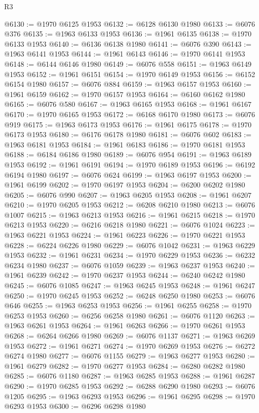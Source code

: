 \begin{lexlean}{R3}
\begin{coremodule}
@6130 := @1970 @6125 @1953
@6132 := @6128 @6130 @1980
@6133 := @6076 @376
@6135 := @1963 @6133 @1953
@6136 := @1961 @6135
@6138 := @1970 @6133 @1953
@6140 := @6136 @6138 @1980
@6141 := @6076 @390
@6143 := @1963 @6141 @1953
@6144 := @1961 @6143
@6146 := @1970 @6141 @1953
@6148 := @6144 @6146 @1980
@6149 := @6076 @558
@6151 := @1963 @6149 @1953
@6152 := @1961 @6151
@6154 := @1970 @6149 @1953
@6156 := @6152 @6154 @1980
@6157 := @6076 @884
@6159 := @1963 @6157 @1953
@6160 := @1961 @6159
@6162 := @1970 @6157 @1953
@6164 := @6160 @6162 @1980
@6165 := @6076 @580
@6167 := @1963 @6165 @1953
@6168 := @1961 @6167
@6170 := @1970 @6165 @1953
@6172 := @6168 @6170 @1980
@6173 := @6076 @919
@6175 := @1963 @6173 @1953
@6176 := @1961 @6175
@6178 := @1970 @6173 @1953
@6180 := @6176 @6178 @1980
@6181 := @6076 @602
@6183 := @1963 @6181 @1953
@6184 := @1961 @6183
@6186 := @1970 @6181 @1953
@6188 := @6184 @6186 @1980
@6189 := @6076 @954
@6191 := @1963 @6189 @1953
@6192 := @1961 @6191
@6194 := @1970 @6189 @1953
@6196 := @6192 @6194 @1980
@6197 := @6076 @624
@6199 := @1963 @6197 @1953
@6200 := @1961 @6199
@6202 := @1970 @6197 @1953
@6204 := @6200 @6202 @1980
@6205 := @6076 @990
@6207 := @1963 @6205 @1953
@6208 := @1961 @6207
@6210 := @1970 @6205 @1953
@6212 := @6208 @6210 @1980
@6213 := @6076 @1007
@6215 := @1963 @6213 @1953
@6216 := @1961 @6215
@6218 := @1970 @6213 @1953
@6220 := @6216 @6218 @1980
@6221 := @6076 @1024
@6223 := @1963 @6221 @1953
@6224 := @1961 @6223
@6226 := @1970 @6221 @1953
@6228 := @6224 @6226 @1980
@6229 := @6076 @1042
@6231 := @1963 @6229 @1953
@6232 := @1961 @6231
@6234 := @1970 @6229 @1953
@6236 := @6232 @6234 @1980
@6237 := @6076 @1059
@6239 := @1963 @6237 @1953
@6240 := @1961 @6239
@6242 := @1970 @6237 @1953
@6244 := @6240 @6242 @1980
@6245 := @6076 @1085
@6247 := @1963 @6245 @1953
@6248 := @1961 @6247
@6250 := @1970 @6245 @1953
@6252 := @6248 @6250 @1980
@6253 := @6076 @646
@6255 := @1963 @6253 @1953
@6256 := @1961 @6255
@6258 := @1970 @6253 @1953
@6260 := @6256 @6258 @1980
@6261 := @6076 @1120
@6263 := @1963 @6261 @1953
@6264 := @1961 @6263
@6266 := @1970 @6261 @1953
@6268 := @6264 @6266 @1980
@6269 := @6076 @1137
@6271 := @1963 @6269 @1953
@6272 := @1961 @6271
@6274 := @1970 @6269 @1953
@6276 := @6272 @6274 @1980
@6277 := @6076 @1155
@6279 := @1963 @6277 @1953
@6280 := @1961 @6279
@6282 := @1970 @6277 @1953
@6284 := @6280 @6282 @1980
@6285 := @6076 @1180
@6287 := @1963 @6285 @1953
@6288 := @1961 @6287
@6290 := @1970 @6285 @1953
@6292 := @6288 @6290 @1980
@6293 := @6076 @1205
@6295 := @1963 @6293 @1953
@6296 := @1961 @6295
@6298 := @1970 @6293 @1953
@6300 := @6296 @6298 @1980

\end{coremodule}
\end{lexlean}
